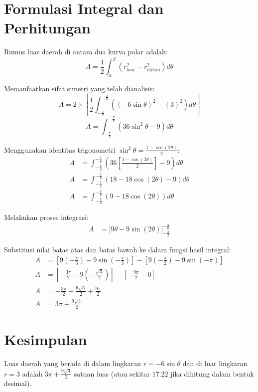 \documentclass[11pt,a4paper]{article}
\begin{document}
\section{Formulasi Integral dan Perhitungan}
Rumus luas daerah di antara dua kurva polar adalah:
\begin{equation}
  A = \frac{1}{2} \int_{\alpha}^{\beta} \left( r_{\text{luar}}^2 - r_{\text{dalam}}^2 \right) d\theta
\end{equation}

Memanfaatkan sifat simetri yang telah dianalisis:
\begin{equation}
  A = 2 \times \left[ \frac{1}{2} \int_{-\frac{\pi}{2}}^{-\frac{\pi}{6}} \left( (-6\sin\theta)^2 - (3)^2 \right) d\theta \right]
\end{equation}
\begin{equation}
  A = \int_{-\frac{\pi}{2}}^{-\frac{\pi}{6}} \left( 36\sin^2\theta - 9 \right) d\theta
\end{equation}

Menggunakan identitas trigonometri $\sin^2\theta = \frac{1 - \cos(2\theta)}{2}$:
\begin{align*}
  A &= \int_{-\frac{\pi}{2}}^{-\frac{\pi}{6}} \left( 36\left[\frac{1 - \cos(2\theta)}{2}\right] - 9 \right) d\theta \\
  A &= \int_{-\frac{\pi}{2}}^{-\frac{\pi}{6}} \left( 18 - 18\cos(2\theta) - 9 \right) d\theta \\
  A &= \int_{-\frac{\pi}{2}}^{-\frac{\pi}{6}} \left( 9 - 18\cos(2\theta) \right) d\theta
\end{align*}

Melakukan proses integrasi:
\begin{align*}
  A &= \Big[ 9\theta - 9\sin(2\theta) \Big]_{-\frac{\pi}{2}}^{-\frac{\pi}{6}}
\end{align*}

Substitusi nilai batas atas dan batas bawah ke dalam fungsi hasil integral:
\begin{align*}
  A &= \left[ 9\left(-\frac{\pi}{6}\right) - 9\sin\left(-\frac{\pi}{3}\right) \right] - \left[ 9\left(-\frac{\pi}{2}\right) - 9\sin(-\pi) \right] \\
  A &= \left[ -\frac{3\pi}{2} - 9\left(-\frac{\sqrt{3}}{2}\right) \right] - \left[ -\frac{9\pi}{2} - 0 \right] \\
  A &= -\frac{3\pi}{2} + \frac{9\sqrt{3}}{2} + \frac{9\pi}{2} \\
  A &= 3\pi + \frac{9\sqrt{3}}{2}
\end{align*}

\section{Kesimpulan}
Luas daerah yang berada di dalam lingkaran $r = -6\sin\theta$ dan di luar lingkaran $r = 3$ adalah \textbf{$3\pi + \frac{9\sqrt{3}}{2}$} satuan luas (atau sekitar \textbf{$17.22$} jika dihitung dalam bentuk desimal).
\end{document}
